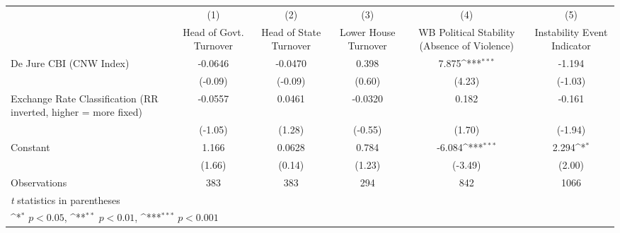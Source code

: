 {
\def\sym#1{\ifmmode^{#1}\else\(^{#1}\)\fi}
\begin{tabular*}{\linewidth}{@{\hskip\tabcolsep\extracolsep\fill}l*{5}{c}}
\hline\hline
                &\multicolumn{1}{c}{(1)}&\multicolumn{1}{c}{(2)}&\multicolumn{1}{c}{(3)}&\multicolumn{1}{c}{(4)}&\multicolumn{1}{c}{(5)}\\
                &\multicolumn{1}{c}{Head of Govt. Turnover}&\multicolumn{1}{c}{Head of State Turnover}&\multicolumn{1}{c}{Lower House Turnover}&\multicolumn{1}{c}{WB Political Stability (Absence of Violence)}&\multicolumn{1}{c}{Instability Event Indicator}\\
\hline
De Jure CBI (CNW Index)&  -0.0646         &  -0.0470         &    0.398         &    7.875\sym{***}&   -1.194         \\
                &  (-0.09)         &  (-0.09)         &   (0.60)         &   (4.23)         &  (-1.03)         \\
[1em]
Exchange Rate Classification (RR inverted, higher = more fixed)&  -0.0557         &   0.0461         &  -0.0320         &    0.182         &   -0.161         \\
                &  (-1.05)         &   (1.28)         &  (-0.55)         &   (1.70)         &  (-1.94)         \\
[1em]
Constant        &    1.166         &   0.0628         &    0.784         &   -6.084\sym{***}&    2.294\sym{*}  \\
                &   (1.66)         &   (0.14)         &   (1.23)         &  (-3.49)         &   (2.00)         \\
\hline
Observations    &      383         &      383         &      294         &      842         &     1066         \\
\hline\hline
\multicolumn{6}{l}{\footnotesize \textit{t} statistics in parentheses}\\
\multicolumn{6}{l}{\footnotesize \sym{*} \(p<0.05\), \sym{**} \(p<0.01\), \sym{***} \(p<0.001\)}\\
\end{tabular*}
}
